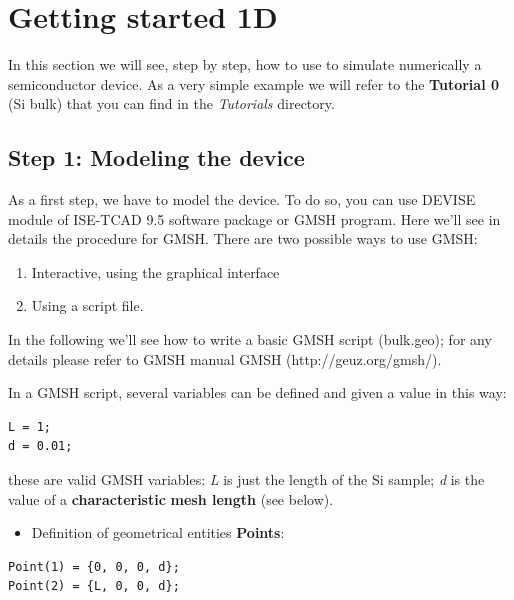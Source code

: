 

\chapter{Getting  started 1D}
\label{chap:Gettingstarted1D}
In this  section we  will  see,  step by  step,  how  to use  \TiberCAD{} to simulate numerically a  semiconductor  device.
As a very  simple example  we  will  refer  to  the  \textbf{Tutorial 0} (Si bulk) that you  can  find  in  the  \textit{Tutorials}  directory.



\section*{Step 1: Modeling the device}

As a first step, we have to model the device. To do so, you can use DEVISE module of ISE-TCAD 9.5 software package or GMSH program.
Here we'll see in details the procedure for GMSH.
There are two possible ways to use GMSH:

    
\begin{enumerate}
	\item Interactive, using the graphical interface
   \item Using a script file.
\end{enumerate}

In the following we'll see how to write a basic GMSH script (bulk.geo); for any details please refer to GMSH manual GMSH (http://geuz.org/gmsh/).

 

 

In a GMSH script, several variables can be defined and given a value in this way:

\begin{verbatim}
L = 1;
d = 0.01;
\end{verbatim}

these are valid GMSH variables: \textit{L} is just the length of the Si sample; \textit{d} is the value of a \textbf{characteristic}
\textbf{mesh length} (see below).
\begin{itemize}
	\item Definition of geometrical entities \textbf{Points}:
\end{itemize}


\begin{verbatim}
Point(1) = {0, 0, 0, d};
Point(2) = {L, 0, 0, d};
\end{verbatim}

